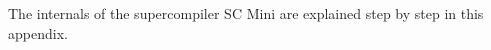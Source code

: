 %

\begin{introduction}
%

\noindent The internals of the supercompiler SC Mini are explained step by step in this appendix.
\end{introduction}

